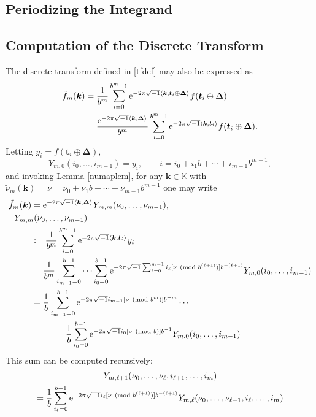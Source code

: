\documentclass[graybox,footinfo]{svmult}
\newcommand{\vt}{\boldsymbol{t}}    %
\newcommand{\vDelta}{\boldsymbol{\Delta}}    %
\newcommand{\bbK}{\mathbb{K}}
\newcommand{\ip}[3][{}]{\ensuremath{\left \langle #2, #3 \right \rangle_{#1}}}
\newcommand{\vk}{\boldsymbol{k}}    %
\newcommand{\tnu}{\tilde{\nu}}
\newcommand{\tf}{\tilde{f}}
\begin{document}
\subsection{Periodizing the Integrand}

\subsection{Computation of the Discrete Transform}
The discrete transform defined in \eqref{tfdef} may also be expressed as
\begin{align}
\nonumber
\tf_m(\vk)
&= \frac{1}{b^m} \sum_{i=0}^{b^m-1} \E^{-2 \pi \sqrt{-1} \ip{\vk}{\vt_i\oplus \vDelta}} f(\vt_i\oplus \vDelta) \\
\nonumber
&= \frac{\E^{-2 \pi \sqrt{-1} \ip{\vk}{\vDelta}}}{b^m} \sum_{i=0}^{b^m-1} \E^{-2 \pi \sqrt{-1} \ip{\vk}{\vt_i}} f(\vt_i\oplus \vDelta).
\end{align}
Letting $y_i=f(\vt_i\oplus \vDelta)$,
\[
Y_{m,0}(i_0,\ldots, i_{m-1}) = y_i, \qquad i=i_0 + i_1 b + \cdots + i_{m-1} b^{m-1},
\]
and invoking Lemma \ref{numaplem}, for any $\vk \in \bbK$ with $\tnu_m(\vk)=\nu = \nu_0 + \nu_1 b  + \cdots + \nu_{m-1} b^{m-1}$ one may write
\begin{align}
\nonumber
\tf_m(\vk) &= \E^{-2 \pi \sqrt{-1} \ip{\vk}{\vDelta}}  Y_{m,m}(\nu_0, \ldots, \nu_{m-1}) , \\
\nonumber
\MoveEqLeft{Y_{m,m}(\nu_0, \ldots, \nu_{m-1})}\\
\nonumber
& : = \frac{1}{b^m} \sum_{i=0}^{b^m-1} \E^{-2 \pi \sqrt{-1} \ip{\vk}{\vt_i}} y_i \\
\nonumber
& = \frac{1}{b^m} \sum_{i_{m-1}=0}^{b-1} \cdots \sum_{i_0=0}^{b-1} \E^{-2 \pi \sqrt{-1}\sum_{\ell=0}^{m-1} i_\ell [\nu \pmod  {b^{(\ell+1)}}]  b^{-(\ell+1)}} Y_{m,0}(i_0,\ldots, i_{m-1}) \\
\nonumber
& = \frac{1}{b} \sum_{i_{m-1}=0}^{b-1}\E^{-2 \pi \sqrt{-1}  i_{m-1}[\nu \pmod  {b^{m}}]  b^{-m}}  \cdots \\
&\qquad \qquad \frac{1}{b} \sum_{i_0=0}^{b-1} \E^{-2 \pi \sqrt{-1} i_0 [\nu \pmod  {b}]  b^{-1}} Y_{m,0}(i_0,\ldots, i_{m-1})
\nonumber
\end{align}
This sum can be computed recursively:
\begin{multline*}
Y_{m,\ell+1}(\nu_0, \ldots, \nu_{\ell},i_{\ell+1}, \ldots, i_m) \\
= \frac{1}{b} \sum_{i_\ell=0}^{b-1} \mathrm{e}^{-2 \pi \sqrt{-1}  i_{\ell}[\nu \pmod  {b^{(\ell+1)}}]  b^{-(\ell+1)}} Y_{m,\ell}(\nu_0, \ldots, \nu_{\ell-1},i_{\ell}, \ldots, i_m)
\end{multline*}
\end{document}
